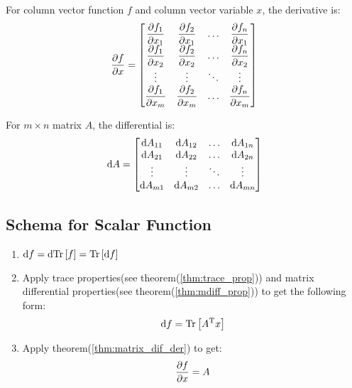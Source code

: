 For column vector function $f$ and column vector variable $x$, the derivative is:
\begin{equation}
	\dfrac{\partial f}{\partial x} = \left[
	\begin{matrix}
			\dfrac{\partial f_1}{\partial x_{1}} & \dfrac{\partial f_2}{\partial x_{1}} & \ldots &\dfrac{\partial f_n}{\partial x_{1}}\\
			\dfrac{\partial f_1}{\partial x_{2}} & \dfrac{\partial f_2}{\partial x_{2}} & \ldots &\dfrac{\partial f_n}{\partial x_{2}}\\
			\vdots & \vdots & \ddots & \vdots \\
			\dfrac{\partial f_1}{\partial x_{m}} & \dfrac{\partial f_2}{\partial x_{m}} & \ldots &\dfrac{\partial f_n}{\partial x_{m}}\\
	\end{matrix}
	\right]
\end{equation}

For $m \times n$ matrix $A$, the differential is:
	\begin{equation}
		\mathrm{d}A = \left[
		\begin{matrix}
			\mathrm{d}A_{11} & \mathrm{d}A_{12} & \ldots &\mathrm{d}A_{1n}\\
			\mathrm{d}A_{21} & \mathrm{d}A_{22} & \ldots &\mathrm{d}A_{2n}\\
			\vdots & \vdots & \ddots & \vdots \\
			\mathrm{d}A_{m1} & \mathrm{d}A_{m2} & \ldots &\mathrm{d}A_{mn}\\
		\end{matrix}
		\right]
	\end{equation}	 

\subsection{Schema for Scalar Function}
\begin{enumerate}
	\item $\mathrm{d}f = \mathrm{d}\mathrm{Tr}\left[f\right] =\mathrm{Tr}\left[\mathrm{d}f\right] $
	\item Apply trace properties(see theorem(\ref{thm:trace_prop}))
	and matrix differential properties(see theorem(\ref{thm:mdiff_prop}))
	to get the following form:
		\begin{equation}
			\mathrm{d}f = \mathrm{Tr}\left[A^\mathrm{T}x\right]
		\end{equation}
	\item Apply theorem(\ref{thm:matrix_dif_der}) to get:
		\begin{equation}
			\dfrac{\partial f}{\partial x} = A
		\end{equation}
\end{enumerate}

